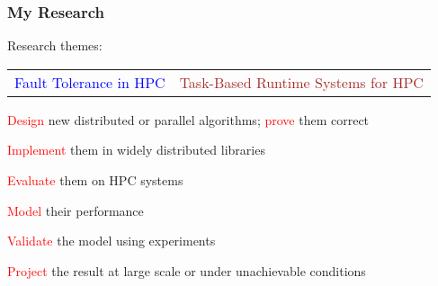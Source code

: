 \begin{frame}
  \frametitle{My Research}

  Research themes:
  \begin{center}

    \begin{tabular}{r|l}
      \textcolor{blue}{Fault Tolerance in HPC} & \textcolor{brown}{Task-Based Runtime Systems for HPC}
    \end{tabular}

    \bigskip

    \textcolor{red}{Design} new distributed or parallel algorithms; \textcolor{red}{prove} them correct

    \textcolor{red}{Implement} them in widely distributed libraries

    \textcolor{red}{Evaluate} them on HPC systems

    \textcolor{red}{Model} their performance
    
    \textcolor{red}{Validate} the model using experiments

    \textcolor{red}{Project} the result at large scale or under unachievable conditions

  \end{center}
\end{frame}




